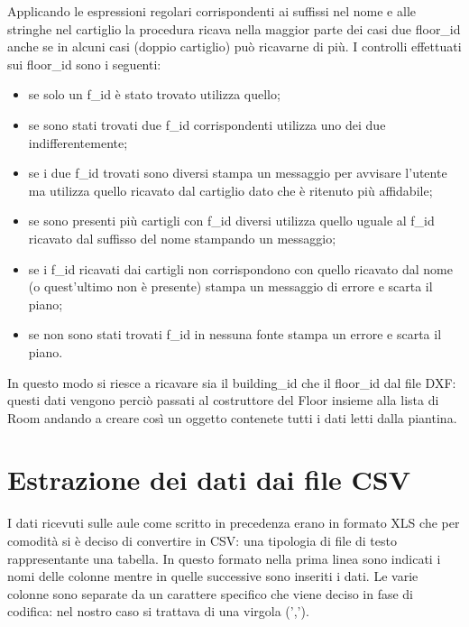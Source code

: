 \documentclass[12pt]{report}
\begin{document}
\vspace{5mm} %

Applicando le espressioni regolari corrispondenti ai suffissi nel nome e alle stringhe nel cartiglio la procedura ricava nella maggior parte dei casi due floor\_id anche se in alcuni casi (doppio cartiglio) può ricavarne di più. 
I controlli effettuati sui floor\_id sono i seguenti:
\begin{itemize}
\item se solo un f\_id è stato trovato utilizza quello;
\item se sono stati trovati due f\_id corrispondenti utilizza uno dei due indifferentemente;
\item se i due f\_id trovati sono diversi stampa un messaggio per avvisare l'utente ma utilizza quello ricavato dal cartiglio dato che è ritenuto più affidabile;
\item se sono presenti più cartigli con f\_id diversi utilizza quello uguale al f\_id ricavato dal suffisso del nome stampando un messaggio;
\item se i f\_id ricavati dai cartigli non corrispondono con quello ricavato dal nome (o quest'ultimo non  è presente) stampa un messaggio di errore e scarta il piano;
\item se non sono stati trovati f\_id in nessuna fonte stampa un errore e scarta il piano.  
\end{itemize}

In questo modo si riesce a ricavare sia il building\_id che il floor\_id dal file DXF: questi dati vengono perciò passati al costruttore del Floor insieme alla lista di Room andando a creare così un oggetto contenete tutti i dati letti dalla piantina.

\newpage
\section{Estrazione dei dati dai file CSV}

I dati ricevuti sulle aule come scritto in precedenza erano in formato XLS che per comodità si è deciso di convertire in CSV: una tipologia di file di testo rappresentante una tabella.
In questo formato nella prima linea sono indicati i nomi delle colonne mentre in quelle successive sono inseriti i dati. Le varie colonne sono separate da un carattere specifico che viene deciso in fase di codifica: nel nostro caso si trattava di una virgola (','). %
\end{document}

